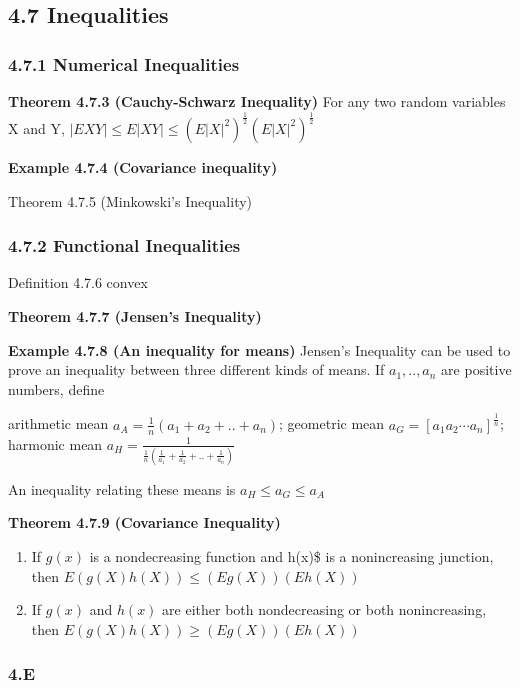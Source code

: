 \documentclass[10pt,twocolumn,portrait]{article}
\begin{document}
\hypertarget{inequalities}{%
\subsection{4.7 Inequalities}\label{inequalities}}

\hypertarget{numerical-inequalities}{%
\subsubsection{4.7.1 Numerical
Inequalities}\label{numerical-inequalities}}

\textbf{Theorem 4.7.3 (Cauchy-Schwarz Inequality)} For any two random
variables X and Y,
\(|EXY|\le E|XY|\le(E|X|^2)^{\frac12}(E|X|^2)^{\frac12}\)

\textbf{Example 4.7.4 (Covariance inequality)}

Theorem 4.7.5 (Minkowski's Inequality)

\hypertarget{Jens}{%
\subsubsection{4.7.2 Functional Inequalities}\label{Jens}}

Definition 4.7.6 convex

\textbf{Theorem 4.7.7 (Jensen's Inequality)}

\textbf{Example 4.7.8 (An inequality for means)} Jensen's Inequality can
be used to prove an inequality between three different kinds of means.
If \(a_1,..,a_n\) are positive numbers, define

arithmetic mean \(a_A=\frac1n(a_1+a_2+..+a_n)\); geometric mean
\(a_G=[a_1a_2\cdots a_n]^{\frac1n}\); harmonic mean
\(a_H=\frac{1}{\frac1n(\frac1{a_1}+\frac1{a_2}+..+\frac1{a_n})}\)

An inequality relating these means is \(a_H\le a_G\le a_A\)

\textbf{Theorem 4.7.9 (Covariance Inequality)}

\begin{enumerate}
\def\labelenumi{\alph{enumi}.}
\item
  If \(g(x)\) is a nondecreasing function and h(x)\$ is a nonincreasing
  junction, then \(E(g(X)h(X))\le(Eg(X))(Eh(X))\)
\item
  If \(g(x)\) and \(h(x)\) are either both nondecreasing or both
  nonincreasing, then \(E(g(X)h(X))\ge(Eg(X))(Eh(X))\)
\end{enumerate}

\hypertarget{Dirichlet}{%
\subsubsection{4.E}\label{Dirichlet}}
\end{document}
